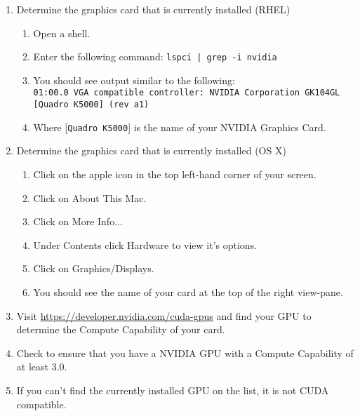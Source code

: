 \documentclass[12pt]{article}
\begin{document}

\begin{enumerate}
\item Determine the graphics card that is currently installed (RHEL)
\begin{enumerate}
\item Open a shell.
\item Enter the following command: \texttt{lspci | grep -i nvidia}
\item You should see output similar to the following:\\
\texttt{01:00.0 VGA compatible controller: NVIDIA Corporation GK104GL}\\
\texttt{[Quadro K5000] (rev a1)}
\item Where [\texttt{Quadro K5000}] is the name of your NVIDIA Graphics Card.
\end{enumerate}

\item Determine the graphics card that is currently installed (OS X)
\begin{enumerate}
\item Click on the apple icon in the top left-hand corner of your screen.
\item Click on About This Mac.
\item Click on More Info...
\item Under Contents click Hardware to view it's options.
\item Click on Graphics/Displays.
\item You should see the name of your card at the top of the right view-pane.
\end{enumerate}

\item Visit \url{https://developer.nvidia.com/cuda-gpus} and find your GPU to determine the Compute Capability of your card.
\item Check to ensure that you have a NVIDIA GPU with a  Compute Capability of at least 3.0.
\item If you can't find the currently installed GPU on the list, it is not CUDA compatible.
\end{enumerate}
\end{document}
